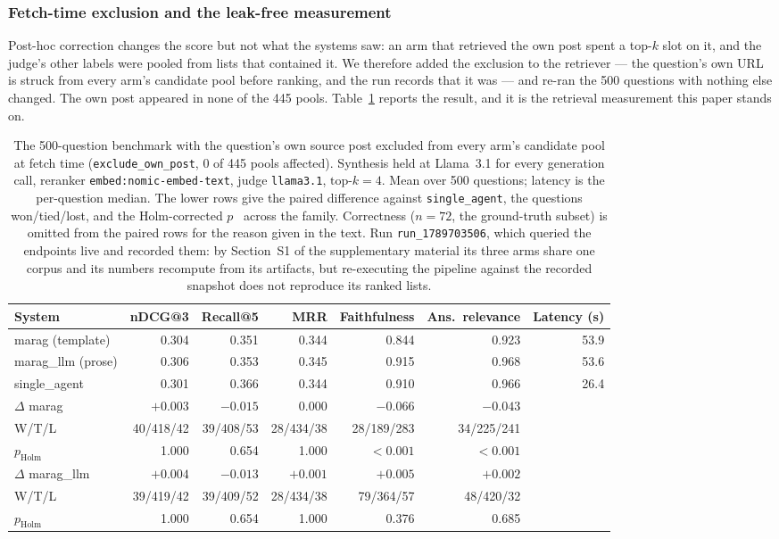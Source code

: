\documentclass[acmsmall,review,anonymous,screen]{acmart}
\begin{document}
\subsubsection{Fetch-time exclusion and the leak-free measurement}

Post-hoc correction changes the score but not what the systems saw: an arm that
retrieved the own post spent a top-$k$ slot on it, and the judge's other labels
were pooled from lists that contained it. We therefore added the exclusion to
the retriever --- the question's own URL is struck from every arm's candidate
pool before ranking, and the run records that it was --- and re-ran the 500
questions with nothing else changed. The own post appeared in none of the 445
pools. Table~\ref{tab:clean} reports the result, and it is the retrieval
measurement this paper stands on.

\begin{table}[t]
\caption{The 500-question benchmark with the question's own source post
excluded from every arm's candidate pool at fetch time
(\texttt{exclude\_own\_post}, 0 of 445 pools affected). Synthesis held at
Llama~3.1 for every generation call, reranker \texttt{embed:nomic-embed-text},
judge \texttt{llama3.1}, $\text{top-}k=4$. Mean over 500 questions; latency is
the per-question median. The lower rows give the paired difference against
\texttt{single\_agent}, the questions won/tied/lost, and the Holm-corrected
$p$~\cite{holm1979} across the family. Correctness ($n=72$, the ground-truth subset) is
omitted from the paired rows for the reason given in the text. Run
\texttt{run\_1789703506}, which queried the endpoints live and recorded them:
by Section~S1 of the supplementary material its three arms share one corpus and its numbers
recompute from its artifacts, but re-executing the pipeline against the
recorded snapshot does not reproduce its ranked lists.}
\label{tab:clean}
\small\setlength{\tabcolsep}{4pt}
\begin{tabular}{lrrrrrr}
\toprule
System & nDCG@3 & Recall@5 & MRR & Faithfulness & Ans.\ relevance & Latency (s) \\
\midrule
marag (template)  & 0.304 & 0.351 & 0.344 & 0.844 & 0.923 & 53.9 \\
marag\_llm (prose) & 0.306 & 0.353 & 0.345 & 0.915 & 0.968 & 53.6 \\
single\_agent     & 0.301 & 0.366 & 0.344 & 0.910 & 0.966 & 26.4 \\
\midrule
$\Delta$ marag        & $+0.003$ & $-0.015$ & $0.000$ & $\mathbf{-0.066}$ & $-0.043$ & \\
\quad W/T/L           & 40/418/42 & 39/408/53 & 28/434/38 & 28/189/283 & 34/225/241 & \\
\quad $p_{\text{Holm}}$ & 1.000 & 0.654 & 1.000 & $\mathbf{<0.001}$ & $<0.001$ & \\
$\Delta$ marag\_llm   & $+0.004$ & $-0.013$ & $+0.001$ & $+0.005$ & $+0.002$ & \\
\quad W/T/L           & 39/419/42 & 39/409/52 & 28/434/38 & 79/364/57 & 48/420/32 & \\
\quad $p_{\text{Holm}}$ & 1.000 & 0.654 & 1.000 & 0.376 & 0.685 & \\
\bottomrule
\end{tabular}
\end{table}
\end{document}
